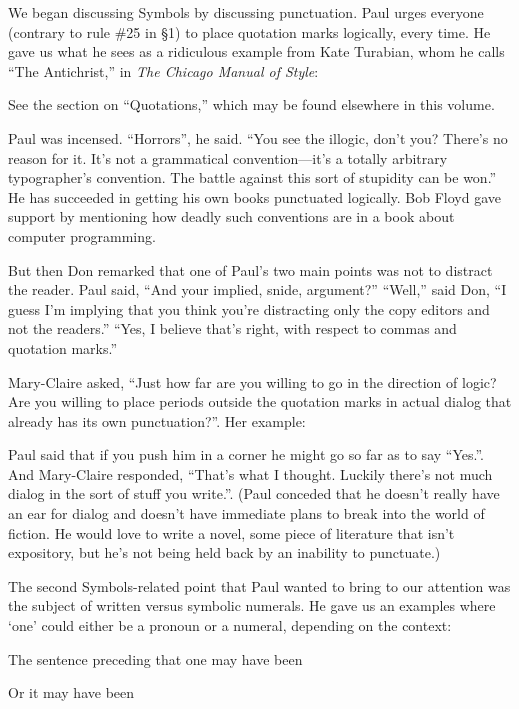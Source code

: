 We began discussing Symbols by discussing punctuation.  Paul urges everyone
(contrary to rule \#25 in \S1) to place quotation marks logically,
every time.  He gave us what he sees as a ridiculous example from
Kate Turabian, whom he calls ``The Antichrist,'' in {\sl The Chicago Manual of
Style\/}:

{\narrower\par\nobreak\smallskip\noindent
	See the section on ``Quotations,'' which may be found elsewhere in 
	this volume.
\smallskip}

Paul was incensed.  ``Horrors'', he said. ``You see the illogic,
don't you? There's no reason for it. It's not
a grammatical convention---it's a totally arbitrary typographer's
convention. The battle against this sort of stupidity can be won.''
He has succeeded in getting his own books punctuated logically.
Bob Floyd gave support by mentioning how deadly such 
conventions are in a book about computer programming.

But then Don remarked that one of Paul's two main points was not
to distract the reader. Paul said,
``And your implied, snide, argument?'' ``Well,'' said Don, ``I guess I'm
implying that you think you're distracting only the copy editors and not
the readers.'' ``Yes, I believe that's right, with respect to commas
and quotation marks.''

Mary-Claire asked, ``Just how far are you willing to go in the direction of
logic?  Are you willing to place periods outside the quotation marks in
actual dialog that already has its own punctuation?''. Her example:
\par\nobreak\smallskip
{}
Paul said that if you push him in a corner he might go so far as to say ``Yes.''.
And Mary-Claire responded,
``That's what I thought.  Luckily there's not much dialog in the sort of stuff
you write.''.  (Paul conceded that he doesn't really have an ear for
dialog and doesn't have immediate
plans to break into the world of fiction. He would love to write a novel,
some piece of literature that isn't expository, but 
he's not being held back by an inability to punctuate.)

The second Symbols-related point that Paul wanted to bring to our
attention was the subject of written versus symbolic numerals.  He gave us
an examples where `one' could either be a pronoun or a numeral,
depending on the context:
\par\nobreak\smallskip
{}
The sentence preceding that one may have been
\par\nobreak\smallskip
{}
Or it may have been
\par\nobreak\smallskip
{}

